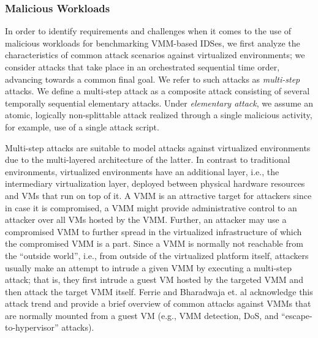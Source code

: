 \subsubsection{Malicious Workloads}
\label{sec:malicious_workloads}

In order to identify requirements and challenges when it comes to the use of malicious workloads for benchmarking VMM-based IDSes, we first analyze the characteristics of common attack scenarios against virtualized environments; we consider attacks that take place in an orchestrated sequential time order, advancing towards a common final goal. We refer to such attacks as \emph{multi-step} attacks. We define a multi-step attack as a composite attack consisting of several temporally sequential elementary attacks. Under \emph{elementary attack}, we assume an atomic, logically non-splittable attack realized through a single malicious activity, for example, use of a single attack script. 

Multi-step attacks are suitable to model attacks against virtualized environments due to the multi-layered architecture of the latter. In contrast to traditional environments, virtualized environments have an additional layer, i.e., the intermediary virtualization layer, deployed between physical hardware resources and VMs that run on top of it. A VMM is an attractive target for attackers since in case it is compromised, a VMM might provide administrative control to an attacker over all VMs hosted by the VMM. Further, an attacker may use a compromised VMM to further spread in the virtualized infrastructure of which the compromised VMM is a part. Since a VMM is normally not reachable from the ``outside world'', i.e., from outside of the virtualized platform itself, attackers usually make an attempt to intrude a given VMM by executing a multi-step attack; that is, they first intrude a guest VM hosted by the targeted VMM and then attack the target VMM itself. Ferrie \cite{ferrie:attacks} and Bharadwaja et. al \cite{bharadwaja:axen} acknowledge this attack trend and provide a brief overview of common attacks against VMMs that are normally mounted from a guest VM (e.g., VMM detection, DoS, and ``escape-to-hypervisor'' attacks). 

